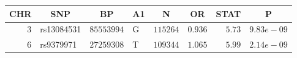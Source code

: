 \begin{tabular}{rlrlrrrr}
\hline\hline
\multicolumn{1}{c}{CHR}&\multicolumn{1}{c}{SNP}&\multicolumn{1}{c}{BP}&\multicolumn{1}{c}{A1}&\multicolumn{1}{c}{N}&\multicolumn{1}{c}{OR}&\multicolumn{1}{c}{STAT}&\multicolumn{1}{c}{P}\tabularnewline
\hline
$3$ & rs13084531 & $85553994$ & G & $115264$ & $0.936$ & $5.73$ & $9.83e-09$\tabularnewline
$6$ & rs9379971  & $27259308$ & T & $109344$ & $1.065$ & $ 5.99$ & $2.14e-09$\tabularnewline
\hline
\end{tabular}
